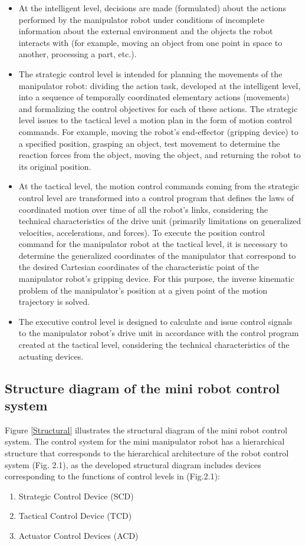 \begin{itemize}
	\item At the intelligent level, decisions are made (formulated) about the actions performed by the manipulator robot under conditions of incomplete information about the external environment and the objects the robot interacts with (for example, moving an object from one point in space to another, processing a part, etc.).
	\item The strategic control level is intended for planning the movements of the manipulator robot: dividing the action task, developed at the intelligent level, into a sequence of temporally coordinated elementary actions (movements) and formalizing the control objectives for each of these actions. The strategic level issues to the tactical level a motion plan in the form of motion control commands. For example, moving the robot's end-effector (gripping device) to a specified position, grasping an object, test movement to determine the reaction forces from the object, moving the object, and returning the robot to its original position.
	\item At the tactical level, the motion control commands coming from the strategic control level are transformed into a control program that defines the laws of coordinated motion over time of all the robot's links, considering the technical characteristics of the drive unit (primarily limitations on generalized velocities, accelerations, and forces). To execute the position control command for the manipulator robot at the tactical level, it is necessary to determine the generalized coordinates of the manipulator that correspond to the desired Cartesian coordinates of the characteristic point of the manipulator robot's gripping device. For this purpose, the inverse kinematic problem of the manipulator's position at a given point of the motion trajectory is solved.
	\item The executive control level is designed to calculate and issue control signals to the manipulator robot's drive unit in accordance with the control program created at the tactical level, considering the technical characteristics of the actuating devices.
\end{itemize}

\subsection{Structure diagram of the mini robot control system}

Figure \ref{Structural} illustrates the structural diagram of the mini robot control system. The control system for the mini manipulator robot has a hierarchical structure that corresponds to the hierarchical architecture of the robot control system (Fig. 2.1), as the developed structural diagram includes devices corresponding to the functions of control levels in (Fig.2.1):
\begin{enumerate}
	\item Strategic Control Device (SCD)
	\item Tactical Control Device (TCD)
	\item Actuator Control Devices (ACD)
\end{enumerate}

